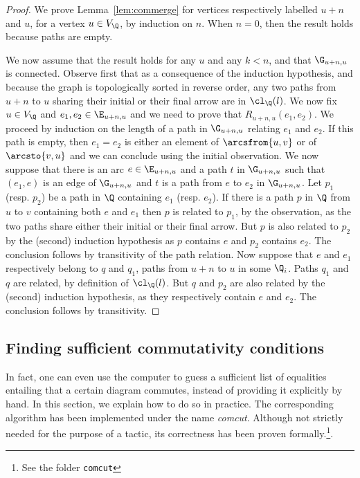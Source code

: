 \documentclass[a4paper,UKenglish,cleveref, autoref, thm-restate]{lipics-v2021}
\begin{document}
\begin{proof}
  We prove Lemma~\ref{lem:commerge} for vertices respectively labelled $u + n$ and $u$, for a vertex $u \in V_\Q$, by induction on $n$. When $n = 0$, then the result holds because paths are empty.

  We now assume that the result holds for any $u$ and any $k < n$, and that $\G_{u+n,u}$ is connected. Observe first that as a consequence of the induction hypothesis, and because the graph is  topologically sorted in reverse order, any two paths from $u + n$ to $u$ sharing their initial or their final arrow are in $\cl_\Q(l)$. We now fix $u\in V_\Q$ and $e_1, e_2 \in \E_{u+n,u}$ and we need to prove that $R_{u+n,u}(e_1, e_2)$. We proceed by induction on the length of a path in $\G_{u+n,u}$ relating $e_1$ and $e_2$. If this path is empty, then $e_1 = e_2$ is either an element of $\arcsfrom{u,v}$ or of $\arcsto{v,u}$ and we can conclude using the initial observation. We now suppose that there is an arc $e\in \E_{u+n,u}$ and a path $t$ in $\G_{u+n,u}$ such that $(e_1, e)$ is an edge of $\G_{u+n,u}$ and $t$ is a path from $e$ to $e_2$ in $\G_{u+n,u}$. Let $p_1$ (resp. $p_2$) be a path in $\Q$ containing $e_1$  (resp. $e_2$). If there is a path $p$ in $\Q$ from $u$ to $v$ containing both $e$ and $e_1$ then $p$ is related to $p_1$, by the observation, as the two paths share either their initial or their final arrow. But $p$ is also related to $p_2$ by the (second) induction hypothesis as $p$ contains $e$ and $p_2$ contains $e_2$. The conclusion follows by transitivity of the path relation. Now suppose that $e$ and $e_1$ respectively belong to $q$ and $q_1$, paths from $u+n$ to $u$ in some $\Q_i$. Paths $q_1$ and $q$ are related, by definition of $\cl_\Q(l)$. But $q$ and $p_2$ are also related by the (second) induction hypothesis, as they respectively contain $e$ and $e_2$. The conclusion follows by transitivity.
\end{proof}



\subsection{Finding sufficient commutativity conditions}\label{ssec:comcut}

In fact, one can even use the computer to guess a sufficient list of equalities entailing that a certain diagram commutes, instead of providing it explicitly by hand. In this section, we explain how to do so in practice. The corresponding algorithm has been implemented under the name \emph{comcut}. Although not strictly needed for the purpose of a tactic, its correctness has been proven formally.\footnote{See the folder \texttt{comcut}}.
\end{document}
